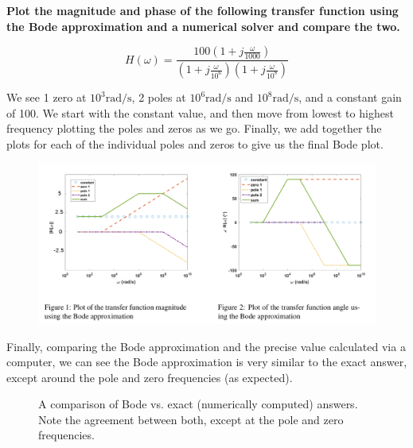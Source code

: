 

\begin{enumerate}
\qitem \textbf{Plot the magnitude and phase of the following transfer function using the Bode approximation and a numerical solver and compare the two.}

\[ H(\omega) = \frac{100 \left(1 + j\frac{\omega}{1000}\right)}{\left(1 + j\frac{\omega}{10^6}\right)\left(1 + j\frac{\omega}{10^8}\right)} \]

We see 1 zero at $10^3 \si{\radian\per\second}$, 2 poles at $10^6 \si{\radian\per\second}$ and $10^8 \si{\radian\per\second}$, and a constant gain of 100. We start with the constant value, and then move from lowest to highest frequency plotting the poles and zeros as we go. Finally, we add together the plots for each of the individual poles and zeros to give us the final Bode plot.


\begin{figure}[H]
  \centering
  \includegraphics[scale=0.5]{figures/q_transfer_to_bode.png}
\end{figure}

Finally, comparing the Bode approximation and the precise value calculated via a computer, we can see the Bode approximation is very similar to the exact answer, except around the pole and zero frequencies (as expected).

\begin{figure}[H]
    \centering
    
\caption{A comparison of Bode vs. exact (numerically computed) answers. Note the agreement between both, except at the pole and zero frequencies.}
\end{figure}
\end{enumerate}